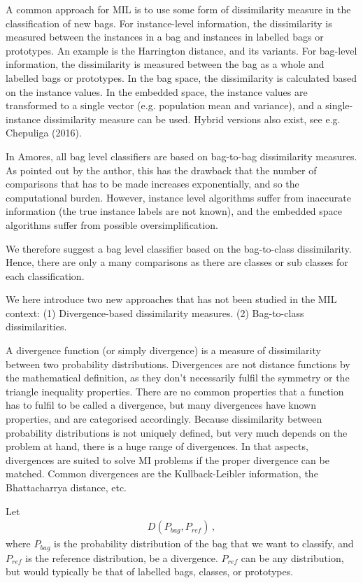 A common approach for MIL is to use some form of dissimilarity measure in the classification of new bags. 
For instance-level information, the dissimilarity is measured between the instances in a bag and instances in labelled bags or prototypes. 
An example is the Harrington distance, and its variants. 
For bag-level information, the dissimilarity is measured between the bag as a whole and labelled bags or prototypes. 
{\color{red} In the bag space, the dissimilarity is calculated based on the instance values.}
In the embedded space, the instance values are transformed to a single vector (e.g. population mean and variance), and a single-instance dissimilarity measure can be used. 
Hybrid versions also exist, see e.g. {\color{green} Chepuliga (2016)}. 

In Amores, all bag level classifiers are based on bag-to-bag dissimilarity measures. 
As pointed out by the author, this has the drawback that the number of comparisons that has to be made increases exponentially, and so the computational burden.
However, instance level algorithms suffer from inaccurate information (the true instance labels are not known), and the embedded space algorithms suffer from possible oversimplification. 

We therefore suggest a bag level classifier based on the bag-to-class dissimilarity. 
Hence, there are only a many comparisons as there are classes or sub classes for each classification. 


We here introduce two new approaches that has not been studied in the MIL context: 
(1) Divergence-based dissimilarity measures. 
(2) Bag-to-class dissimilarities. 

A divergence function (or simply divergence) is a measure of dissimilarity between two probability distributions.
Divergences are not distance functions by the mathematical definition, as they don't necessarily fulfil the symmetry or the triangle inequality properties. 
There are no common properties that a function has to fulfil to be called a divergence, but many divergences have known properties, and are categorised accordingly. 
Because dissimilarity between probability distributions is not uniquely defined, but very much depends on the problem at hand, there is a huge range of divergences. 
In that aspects, divergences are suited to solve MI problems if the proper divergence can be matched. 
Common divergences are the Kullback-Leibler information, the Bhattacharrya distance, etc. 

Let 
\begin{align}
  D(P_{bag}, P_{ref})\, ,
\end{align}
where $P_{bag}$ is the probability distribution of the bag that we want to classify, and $P_{ref}$ is the reference distribution, be a divergence. 
$P_{ref}$ can be any distribution, but would typically be that of labelled bags, classes, or prototypes. 

